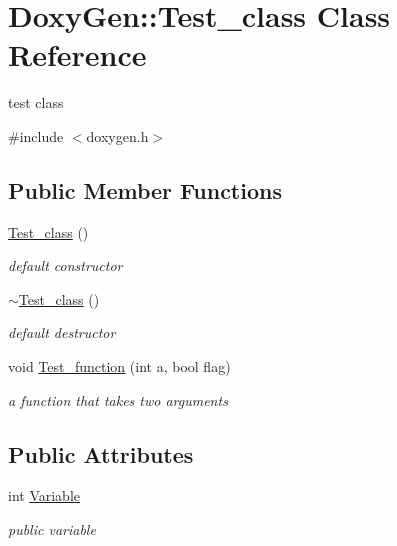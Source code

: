 \hypertarget{class_doxy_gen_1_1_test__class}{}\section{Doxy\+Gen\+:\+:Test\+\_\+class Class Reference}
\label{class_doxy_gen_1_1_test__class}


test class  




{\ttfamily \#include $<$doxygen.\+h$>$}

\subsection*{Public Member Functions}
\begin{DoxyCompactItemize}
\item 
\hypertarget{class_doxy_gen_1_1_test__class_a45055ab6df6923ef6ad11ff58a362343}{}\label{class_doxy_gen_1_1_test__class_a45055ab6df6923ef6ad11ff58a362343} 
\hyperlink{class_doxy_gen_1_1_test__class_a45055ab6df6923ef6ad11ff58a362343}{Test\+\_\+class} ()
\begin{DoxyCompactList}\small\item\em default constructor \end{DoxyCompactList}\item 
\hypertarget{class_doxy_gen_1_1_test__class_a65f84bcbaabed23e4a35e01852b18ef3}{}\label{class_doxy_gen_1_1_test__class_a65f84bcbaabed23e4a35e01852b18ef3} 
\hyperlink{class_doxy_gen_1_1_test__class_a65f84bcbaabed23e4a35e01852b18ef3}{$\sim$\+Test\+\_\+class} ()
\begin{DoxyCompactList}\small\item\em default destructor \end{DoxyCompactList}\item 
void \hyperlink{class_doxy_gen_1_1_test__class_a48b65d1163abaf98d775ef8af2f7dc76}{Test\+\_\+function} (int a, bool flag)
\begin{DoxyCompactList}\small\item\em a function that takes two arguments \end{DoxyCompactList}\end{DoxyCompactItemize}
\subsection*{Public Attributes}
\begin{DoxyCompactItemize}
\item 
\hypertarget{class_doxy_gen_1_1_test__class_ab05b43e97de7768a5b7b79b752cb2009}{}\label{class_doxy_gen_1_1_test__class_ab05b43e97de7768a5b7b79b752cb2009} 
int \hyperlink{class_doxy_gen_1_1_test__class_ab05b43e97de7768a5b7b79b752cb2009}{Variable}
\begin{DoxyCompactList}\small\item\em public variable \end{DoxyCompactList}\end{DoxyCompactItemize}


